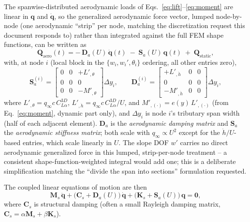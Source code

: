\documentclass[11pt]{article}
\begin{document}
The spanwise-distributed aerodynamic loads of
Eqs.~\eqref{eq:lift}--\eqref{eq:moment} are linear in $\bm{q}$ and $\dot{\bm q}$, so the
generalized aerodynamic force vector, lumped node-by-node (one aerodynamic
``strip'' per node, matching the discretization request this document
responds to) rather than integrated against the full FEM shape functions, can
be written as
\begin{equation}
\bm{Q}_{\text{aero}}(t) = -\,\bm{D}_a(U)\,\dot{\bm q}(t) \;-\; \bm{S}_a(U)\,\bm{q}(t)
\;+\; \bm{Q}_{\text{static}},
\end{equation}
with, at node $i$ (local block in the $\{w_i,w_i',\theta_i\}$ ordering, all
other entries zero),
\begin{equation}
\bm S_a^{(i)} = \begin{bmatrix} 0&0&+L'_{,\theta}\\ 0&0&0\\ 0&0&-M'_{,\theta}\end{bmatrix}\Delta y_i,
\qquad
\bm D_a^{(i)} = \begin{bmatrix} +L'_{,\dot h}&0&0\\ 0&0&0\\ -M'_{,\dot h}&0&0\end{bmatrix}\Delta y_i,
\end{equation}
where $L'_{,\theta}=q_\infty c\,C_{L\alpha}^{3D}$, $L'_{,\dot h}=q_\infty c\,
C_{L\alpha}^{3D}/U$, and $M'_{,(\cdot)} = e(y)\,L'_{,(\cdot)}$ (from
Eq.~\eqref{eq:moment}, dynamic part only), and $\Delta y_i$ is node $i$'s
tributary span width (half of each adjacent element). $\bm D_a$ is the
\emph{aerodynamic damping matrix} and $\bm S_a$ the \emph{aerodynamic stiffness
matrix}; both scale with $q_\infty \propto U^2$ except for the $\dot h/U$-based
entries, which scale linearly in $U$. The slope DOF $w'$ carries no direct
aerodynamic generalized force in this lumped, strip-per-node treatment -- a
consistent shape-function-weighted integral would add one; this is a
deliberate simplification matching the ``divide the span into sections''
formulation requested.

The coupled linear equations of motion are then
\begin{equation}
\bm M_s\,\ddot{\bm q} + \big(\bm C_s + \bm D_a(U)\big)\,\dot{\bm q}
+ \big(\bm K_s + \bm S_a(U)\big)\,\bm q = \bm 0,
\label{eq:coupled}
\end{equation}
where $\bm C_s$ is structural damping (often a small Rayleigh damping matrix,
$\bm C_s = \alpha \bm M_s + \beta \bm K_s$).
\end{document}
